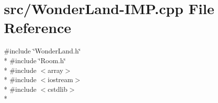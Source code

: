 \hypertarget{WonderLand-IMP_8cpp}{\section{src/\-Wonder\-Land-\/\-I\-M\-P.cpp File Reference}
\label{WonderLand-IMP_8cpp}
}
{\ttfamily \#include \char`\"{}Wonder\-Land.\-h\char`\"{}}\\*
{\ttfamily \#include \char`\"{}Room.\-h\char`\"{}}\\*
{\ttfamily \#include $<$array$>$}\\*
{\ttfamily \#include $<$iostream$>$}\\*
{\ttfamily \#include $<$cstdlib$>$}\\*
